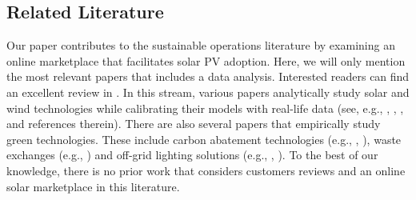 \documentclass[msom,blindrev]{informs3}
\begin{document}
	
\subsection{Related Literature} \label{Sec: Lit}
	
	Our paper contributes to the sustainable operations literature by examining an online marketplace that facilitates solar PV adoption. Here, we will only mention the most relevant papers that includes a data analysis. Interested readers can find an excellent review in \cite{HLee}. In this stream, various papers analytically study solar and wind technologies while calibrating their models with real-life data (see, e.g., \cite{alanwolf}, \cite{NJ}, \cite{SunarandBirge}, and references therein). There are also several papers that empirically study green technologies. These include carbon abatement technologies (e.g., \cite{blanco2020carbon}, \cite{Corbett2}), waste exchanges (e.g., \cite{Suvrat}) and  off-grid lighting solutions (e.g., \cite{uppari}, \cite{Kamalini2019}).
	To the best of our knowledge, there is no prior work that considers customers reviews and an online solar marketplace in this literature.
	
	
	
	
\end{document}
